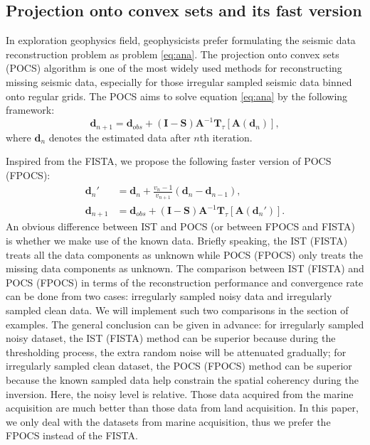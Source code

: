 \subsection{Projection onto convex sets and its fast version}
In exploration geophysics field, geophysicists prefer formulating the seismic data reconstruction problem as problem \ref{eq:ana}. The projection onto convex sets (POCS) algorithm is one of the most widely used methods for reconstructing missing seismic data, especially for those irregular sampled seismic data binned onto regular grids.  The POCS \cite[]{abma2006} aims to solve equation \ref{eq:ana} by the following framework:
\begin{equation}
\label{eq:pocs}
\mathbf{d}_{n+1} = \mathbf{d}_{obs} + (\mathbf{I}-\mathbf{S})\mathbf{A}^{-1}\mathbf{T}_{\tau}\left[\mathbf{A}(\mathbf{d}_n)\right],
\end{equation}
where $\mathbf{d}_n$ denotes the estimated data after $n$th iteration. 

Inspired from the FISTA, we propose the following faster version of POCS (FPOCS):
\begin{equation}
\begin{split}
\mathbf{d}_{n}'  &= \mathbf{d}_n + \frac{v_n-1}{v_{n+1}}(\mathbf{d}_n-\mathbf{d}_{n-1}), \\
\mathbf{d}_{n+1} &= \mathbf{d}_{obs} + (\mathbf{I}-\mathbf{S})\mathbf{A}^{-1}\mathbf{T}_{\tau}\left[\mathbf{A}(\mathbf{d}_{n}')\right].
\end{split}
\end{equation}
An obvious difference between IST and POCS (or between FPOCS and FISTA) is whether we make use of the known data. Briefly speaking, the IST (FISTA) treats all the data components as unknown while POCS (FPOCS) only treats the missing data components as unknown. The comparison between IST (FISTA) and POCS (FPOCS) in terms of the reconstruction performance and convergence rate can be done from two cases: irregularly sampled noisy data and irregularly sampled clean data. We will implement such two comparisons in the section of examples. The general conclusion can be given in advance: for irregularly sampled noisy dataset, the IST (FISTA) method can be superior  because during the thresholding process, the extra random noise will be attenuated gradually; for irregularly sampled clean dataset, the POCS (FPOCS) method can be superior because the known sampled data help constrain the spatial coherency during the inversion. Here, the noisy level is relative. Those data acquired from the marine acquisition are much better than those data from land acquisition. In this paper, we only deal with the datasets from marine acquisition, thus we prefer the FPOCS instead of the FISTA. 

